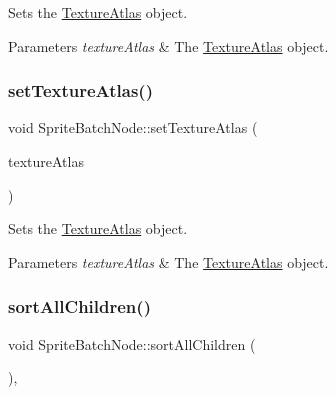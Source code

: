 Sets the \hyperlink{classTextureAtlas}{Texture\+Atlas} object.


\begin{DoxyParams}{Parameters}
{\em texture\+Atlas} & The \hyperlink{classTextureAtlas}{Texture\+Atlas} object. \\
\hline
\end{DoxyParams}
\mbox{\label{classSpriteBatchNode_a53497de819859ff84079d77e11cbd512}} 
\subsubsection{\texorpdfstring{set\+Texture\+Atlas()}{setTextureAtlas()}\hspace{0.1cm}{\footnotesize\ttfamily [2/2]}}
{\footnotesize\ttfamily void Sprite\+Batch\+Node\+::set\+Texture\+Atlas (\begin{DoxyParamCaption}\item[{\hyperlink{classTextureAtlas}{Texture\+Atlas} $\ast$}]{texture\+Atlas }\end{DoxyParamCaption})\hspace{0.3cm}{\ttfamily [inline]}}

Sets the \hyperlink{classTextureAtlas}{Texture\+Atlas} object.


\begin{DoxyParams}{Parameters}
{\em texture\+Atlas} & The \hyperlink{classTextureAtlas}{Texture\+Atlas} object. \\
\hline
\end{DoxyParams}
\mbox{\label{classSpriteBatchNode_af2a850d2c664d2fd1a796601129a0413}} 
\subsubsection{\texorpdfstring{sort\+All\+Children()}{sortAllChildren()}\hspace{0.1cm}{\footnotesize\ttfamily [1/2]}}
{\footnotesize\ttfamily void Sprite\+Batch\+Node\+::sort\+All\+Children (\begin{DoxyParamCaption}{ }\end{DoxyParamCaption})\hspace{0.3cm}{\ttfamily [override]}, {\ttfamily [virtual]}}

